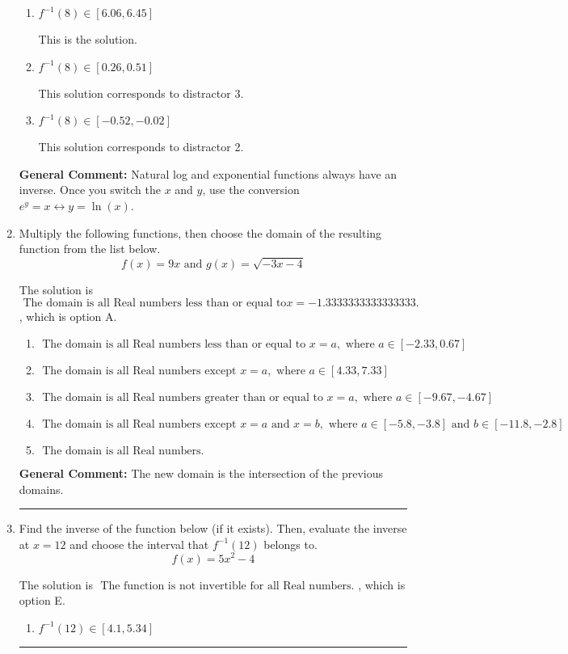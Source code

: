 \documentclass{extbook}[14pt]
\newcommand{\litem}[1]{\item #1

\rule{\textwidth}{0.4pt}}
\begin{document}
\begin{enumerate}
{\begin{enumerate}[label=\Alph*.]
 This solution corresponds to distractor 4.
\item \( f^{-1}(8) \in [6.06, 6.45] \)

 This is the solution.
\item \( f^{-1}(8) \in [0.26, 0.51] \)

 This solution corresponds to distractor 3.
\item \( f^{-1}(8) \in [-0.52, -0.02] \)

 This solution corresponds to distractor 2.
\end{enumerate}

\textbf{General Comment:} Natural log and exponential functions always have an inverse. Once you switch the $x$ and $y$, use the conversion $ e^y = x \leftrightarrow y=\ln(x)$.
}
\litem{
Multiply the following functions, then choose the domain of the resulting function from the list below.
\[ f(x) = 9x \text{ and } g(x) = \sqrt{-3x-4}  \]

The solution is \( \text{ The domain is all Real numbers less than or equal to} x = -1.3333333333333333. \), which is option A.\begin{enumerate}[label=\Alph*.]
\item \( \text{ The domain is all Real numbers less than or equal to } x = a, \text{ where } a \in [-2.33, 0.67] \)


\item \( \text{ The domain is all Real numbers except } x = a, \text{ where } a \in [4.33, 7.33] \)


\item \( \text{ The domain is all Real numbers greater than or equal to } x = a, \text{ where } a \in [-9.67, -4.67] \)


\item \( \text{ The domain is all Real numbers except } x = a \text{ and } x = b, \text{ where } a \in [-5.8, -3.8] \text{ and } b \in [-11.8, -2.8] \)


\item \( \text{ The domain is all Real numbers. } \)


\end{enumerate}

\textbf{General Comment:} The new domain is the intersection of the previous domains.
}
\litem{
Find the inverse of the function below (if it exists). Then, evaluate the inverse at $x = 12$ and choose the interval that $f^{-1}(12)$ belongs to.
\[ f(x) = 5 x^2 - 4 \]

The solution is \( \text{ The function is not invertible for all Real numbers. } \), which is option E.\begin{enumerate}[label=\Alph*.]
\item \( f^{-1}(12) \in [4.1, 5.34] \)


\end{enumerate}}
\end{enumerate}
\end{document}
